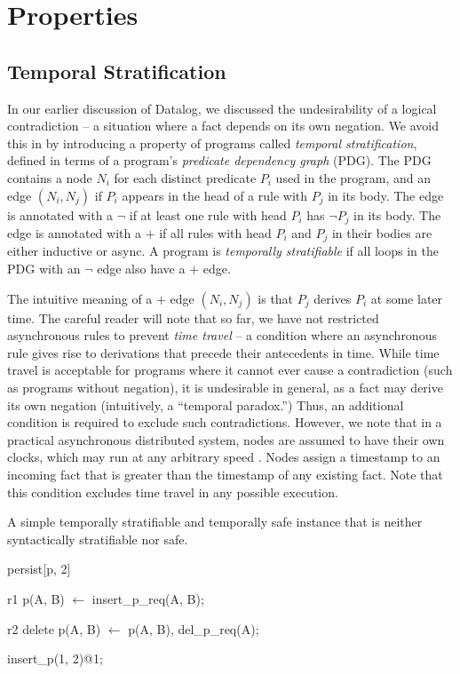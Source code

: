 \section{Properties}

\subsection{Temporal Stratification}

In our earlier discussion of Datalog, we discussed the undesirability of a logical contradiction -- a situation where a fact depends on its own negation.  We avoid this in \lang by introducing a property of programs called {\em temporal stratification}, defined in terms of a program's {\em predicate dependency graph} (PDG).  The PDG contains a node $N_i$ for each distinct predicate $P_i$ used in the program, and an edge $(N_i, N_j)$ if $P_i$ appears in the head of a rule with $P_j$ in its body.  The edge is annotated with a $\lnot$ if at least one rule with head $P_i$ has $\lnot P_j$ in its body.  The edge is annotated with a $+$ if all rules with head $P_i$ and $P_j$ in their bodies are either inductive or async.  A \lang program is {\em temporally stratifiable} if all loops in the PDG with an $\lnot$ edge also have a $+$ edge.

The intuitive meaning of a $+$ edge $(N_i, N_j)$ is that $P_j$ derives $P_i$ at some later time.  The careful reader will note that so far, we have not restricted asynchronous rules to prevent {\em time travel} -- a condition where an asynchronous rule gives rise to derivations that precede their antecedents in time.  While time travel is acceptable for programs where it cannot ever cause a contradiction (such as programs without negation), it is undesirable in general, as a fact may derive its own negation (intuitively, a ``temporal paradox.'')  Thus, an additional condition is required to exclude such contradictions.
However, we note that in a practical asynchronous distributed system, nodes are assumed to have their own clocks, which may run at any arbitrary speed .  Nodes assign a timestamp to an incoming fact that is greater than the timestamp of any existing fact.  Note that this condition excludes time travel in any possible execution.

\begin{example}
\label{ex:stratsafe}
A simple temporally stratifiable and temporally safe \slang instance that is neither syntactically stratifiable nor safe.

\begin{Dedalus}
persist[p, 2]  
  
r1
p(A, B) \(\leftarrow\)
  insert\_p\_req(A, B);

r2  
delete p(A, B) \(\leftarrow\)
  p(A, B),
  del\_p\_req(A);

insert\_p(1, 2)@1;
\end{Dedalus}
\end{example}

